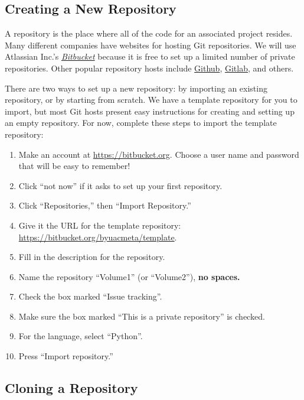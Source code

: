 \subsection*{Creating a New Repository} %

A repository is the place where all of the code for an associated project resides.
Many different companies have websites for hosting Git repositories.
We will use Atlassian Inc.'s \href{https://bitbucket.org/}{\emph{Bitbucket}} because it is free to set up a limited number of private repositories.
Other popular repository hosts include \href{https://github.com/}{Github}, \href{https://gitlab.com/}{Gitlab}, and others.

There are two ways to set up a new repository: by importing an existing repository, or by starting from scratch.
We have a template repository for you to import, but most Git hosts present easy instructions for creating and setting up an empty repository.
For now, complete these steps to import the template repository:

\begin{enumerate}
\item Make an account at \url{https://bitbucket.org}.
Choose a user name and password that will be easy to remember!
\item Click ``not now'' if it asks to set up your first repository.
\item Click ``Repositories,'' then ``Import Repository.''
\item Give it the URL for the template repository: \url{https://bitbucket.org/byuacmeta/template}. %
\item Fill in the description for the repository.
\item Name the repository ``Volume1'' (or ``Volume2''), \textbf{no spaces.}
\item Check the box marked ``Issue tracking''.
\item Make sure the box marked ``This is a private repository'' is checked.
\item For the language, select ``Python''.
\item Press ``Import repository.''
\end{enumerate}

\subsection*{Cloning a Repository} %

